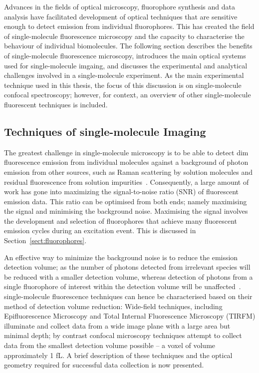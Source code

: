 Advances in the fields of optical microscopy, fluorophore synthesis and data analysis have facilitated development of optical techniques that are sensitive enough to detect emission from individual fluorophores. This has created the field of single-molecule fluorescence microscopy and the capacity to characterise the behaviour of individual biomolecules. The following section describes the benefits of single-molecule fluorescence microscopy, introduces the main optical systems used for single-molecule imgaing, and discusses the experimental and analytical challenges involved in a single-molecule experiment. As the main experimental technique used in this thesis, the focus of this discussion is on single-molecule confocal spectroscopy; however, for context, an overview of other single-molecule fluorescent techniques is included.  

\subsection{Techniques of single-molecule Imaging}
\label{subsect:techniques}
The greatest challenge in single-molecule microscopy is to be able to detect dim fluorescence emission from individual molecules against a background of photon emission from other sources, such as Raman scattering by solution molecules and residual fluorescence from solution impurities~\cite{Moerner2003}. Consequently, a large amount of work has gone into maximizing the signal-to-noise ratio (SNR) of fluorescent emission data. This ratio can be optimised from both ends; namely maximising the signal and minimising the background noise. Maximising the signal involves the development and selection of fluorophores that achieve many fluorescent emission cycles during an excitation event. This is discussed in Section~\ref{sect:fluorophores}. 

An effective way to minimize the background noise is to reduce the emission detection volume; as the number of photons detected from irrelevant species will be reduced with a smaller detection volume, whereas detection of photons from a single fluorophore of interest within the detection volume will be unaffected~\cite{Dillingham2008}. single-molecule fluorescence techniques can hence be characterised based on their method of detection volume reduction: Wide-field techniques, including Epifluorescence Microscopy and Total Internal Fluorescence Microscopy (TIRFM) illuminate and collect data from a wide image plane with a large area but minimal depth; by contrast confocal microscopy techniques attempt to collect data from the smallest detection volume possible -- a voxel of volume approximately 1 fL. A brief description of these techniques and the optical geometry required for successful data collection is now presented. 

